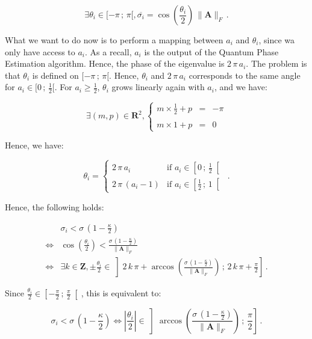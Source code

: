 \documentclass[11pt, a4paper]{article}
\begin{document}
                \[\exists\theta_i\in[-\pi\,;\,\pi[,\overline{\sigma_i}=\cos\left(\frac{\theta_i}{2}\right)\,\|\mathbf{A}\|_F\,.\]
                
                What we want to do now is to perform a mapping between \(a_i\) and \(\theta_i\), since wa only have access to \(a_i\). As a recall, \(a_i\) is the output of the Quantum Phase Estimation algorithm. Hence, the phase of the eigenvalue is \(2\,\pi\,a_i\). The problem is that \(\theta_i\) is defined on \([-\pi\,;\,\pi[\). Hence, \(\theta_i\) and \(2\,\pi\,a_i\) corresponds to the same angle for \(a_i\in[0\,;\,\frac12[\). For \(a_i\geqslant\frac12\), \(\theta_i\) grows linearly again with \(a_i\), and we have:
                
                \[\exists(m,p)\in\mathbf{R}^2,\left\{\begin{array}{lcl}m\times\frac12+p &=& -\pi\\\\m\times1 + p &=& 0\end{array}\right.\]
                
                Hence, we have:
                
                \[\theta_i = \begin{cases}2\,\pi\,a_i&\text{if }a_i\in\left[0\,;\,\frac12\right[\\2\,\pi\,\left(a_i-1\right)&\text{if }a_i\in\left[\frac12\,;\,1\right[\end{cases}\,.\]
                
                Hence, the following holds:
                
                \begin{align*}
                    &\sigma_i < \sigma\,\left(1 - \frac\kappa2\right)\\
                    \iff&\cos\left(\frac{\theta_i}{2}\right) < \frac{\sigma\,\left(1 - \frac\kappa2\right)}{\|\mathbf{A}\|_F}\\
                    \iff&\exists k\in\mathbf{Z},\pm\frac{\theta_i}{2}\in\left]2\,k\,\pi + \arccos\left(\frac{\sigma\,\left(1 - \frac\kappa2\right)}{\|\mathbf{A}\|_F}\right)\,;\,2\,k\,\pi + \frac\pi2\right]\,.
                \end{align*}
                
                Since \(\frac{\theta_i}{2}\in\left[-\frac\pi2\,;\,\frac\pi2\right[\), this is equivalent to:
                
                \[\sigma_i < \sigma\,\left(1 - \frac\kappa2\right)\iff\left|\frac{\theta_i}{2}\right|\in\left]\arccos\left(\frac{\sigma\,\left(1 - \frac\kappa2\right)}{\|\mathbf{A}\|_F}\right)\,;\,\frac\pi2\right]\,.\]
                
\end{document}

